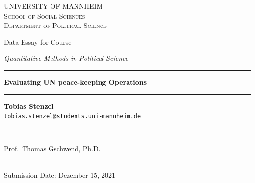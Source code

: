 \documentclass[12pt,english,a4paper,oneside]{article}
\begin{document}
\begin{titlepage}

    \begin{center}
    \large{ \textsc{ \uppercase{University of Mannheim} \\ \vspace{-0.2cm}
School of Social Sciences \\ \vspace{-0.2cm}
Department of Political Science}}

      
        \vspace{3.5cm}
        

       \large{   Data Essay for Course   }


       \large{ \textit{   Quantitative Methods in Political Science   }}

\renewcommand{\linethickness}{0.03em}
\rule{\linewidth}{\linethickness}


       \LARGE{ \textbf{   Evaluating UN peace-keeping Operations   }}


       \large{  }

        \vspace{-0.2cm}
\rule{\linewidth}{\linethickness}


\begin{minipage}[t]{0.5\textwidth}
\begin{flushleft}
\singlespacing
 \textbf{Tobias Stenzel}  \\ 


 \href{mailto:tobias.stenzel@students.uni-mannheim.de}{\nolinkurl{tobias.stenzel@students.uni-mannheim.de}}  \\ 

\end{flushleft}
\end{minipage}
\begin{minipage}[t]{0.4\textwidth}
\hfill
\end{minipage}\\
\vspace{0.2cm}
\begin{minipage}[t]{0.35\textwidth}
\hfill
\end{minipage}
\begin{minipage}[t]{0.55\textwidth}
\begin{flushright}
\singlespacing
     Prof.~Thomas Gschwend, Ph.D.  \\       

\end{flushright}
\end{minipage}\\
%


         \vfill
         Submission Date: Dezember 15, 2021 \\ 
        





         \vfill



     \end{center}
    \thispagestyle{empty}
\end{titlepage}
\end{document}
